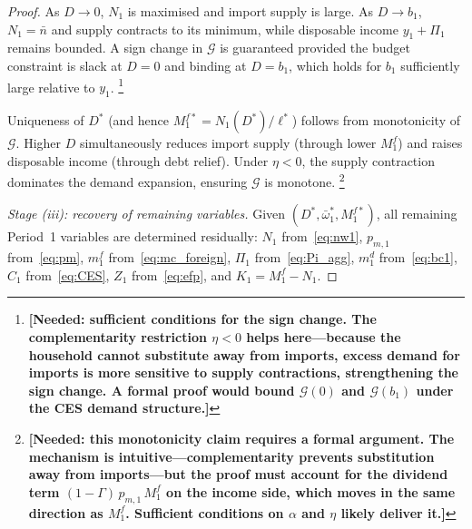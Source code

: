 \begin{proof}
As $D \to 0$, $N_1$ is maximised and import supply is large.  As $D \to b_1$, $N_1 = \bar n$ and supply contracts to its minimum, while disposable income $y_1 + \Pi_1$ remains bounded.  A sign change in $\mathcal{G}$ is guaranteed provided the budget constraint is slack at $D = 0$ and binding at $D = b_1$, which holds for $b_1$ sufficiently large relative to $y_1$.%
\footnote{\textbf{[Needed: sufficient conditions for the sign change.  The complementarity restriction $\eta < 0$ helps here---because the household cannot substitute away from imports, excess demand for imports is more sensitive to supply contractions, strengthening the sign change.  A formal proof would bound $\mathcal{G}(0)$ and $\mathcal{G}(b_1)$ under the CES demand structure.]}}

Uniqueness of $D^*$ (and hence $M_1^{f*} = N_1(D^*)/\ell^*$) follows from monotonicity of $\mathcal{G}$.  Higher $D$ simultaneously reduces import supply (through lower $M_1^f$) and raises disposable income (through debt relief).  Under $\eta < 0$, the supply contraction dominates the demand expansion, ensuring $\mathcal{G}$ is monotone.%
\footnote{\textbf{[Needed: this monotonicity claim requires a formal argument.  The mechanism is intuitive---complementarity prevents substitution away from imports---but the proof must account for the dividend term $(1 - \Gamma)\,p_{m,1}\,M_1^f$ on the income side, which moves in the same direction as $M_1^f$.  Sufficient conditions on $\alpha$ and $\eta$ likely deliver it.]}}

\emph{Stage (iii): recovery of remaining variables.}\quad
Given $(D^*, \bar\omega_1^*, M_1^{f*})$, all remaining Period~1 variables are determined residually: $N_1$ from~\eqref{eq:nw1}, $p_{m,1}$ from~\eqref{eq:pm}, $m_1^f$ from~\eqref{eq:mc_foreign}, $\Pi_1$ from~\eqref{eq:Pi_agg}, $m_1^d$ from~\eqref{eq:bc1}, $C_1$ from~\eqref{eq:CES}, $Z_1$ from~\eqref{eq:efp}, and $K_1 = M_1^f - N_1$.
\end{proof}